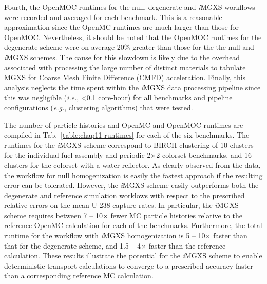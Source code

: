 Fourth, the OpenMOC runtimes for the null, degenerate and \textit{i}\ac{MGXS} workflows were recorded and averaged for each benchmark. This is a reasonable approximation since the OpenMC runtimes are much larger than those for OpenMOC. Nevertheless, it should be noted that the OpenMOC runtimes for the degenerate scheme were on average 20\% greater than those for the the null and \textit{i}\ac{MGXS} schemes. The cause for this slowdown is likely due to the overhead associated with processing the large number of distinct materials to tabulate \ac{MGXS} for Coarse Mesh Finite Difference (\ac{CMFD}) acceleration. Finally, this analysis neglects the time spent within the \textit{i}\ac{MGXS} data processing pipeline since this was negligible (\textit{i.e.}, <0.1 core-hour) for all benchmarks and pipeline configurations (\textit{e.g.}, clustering algorithms) that were tested.

The number of particle histories and OpenMC and OpenMOC runtimes are compiled in Tab.~\ref{table:chap11-runtimes} for each of the six benchmarks. The runtimes for the \textit{i}\ac{MGXS} scheme  correspond to BIRCH clustering of 10 clusters for the individual fuel assembly and periodic 2$\times$2 colorset benchmarks, and 16 clusters for the colorset with a water reflector. As clearly observed from the data, the workflow for null homogenization is easily the fastest approach if the resulting error can be tolerated. However, the \textit{i}\ac{MGXS} scheme easily outperforms both the degenerate and reference simulation worklows with respect to the prescribed relative errors on the mean U-238 capture rates. In particular, the \textit{i}\ac{MGXS} scheme requires between 7 -- 10$\times$ fewer \ac{MC} particle histories relative to the reference OpenMC calculation for each of the benchmarks. Furthermore, the total runtime for the workflow with \textit{i}\ac{MGXS} homogenization is 5 -- 10$\times$ faster than that for the degenerate scheme, and 1.5 -- 4$\times$ faster than the reference calculation. These results illustrate the potential for the \textit{i}\ac{MGXS} scheme to enable deterministic transport calculations to converge to a prescribed accuracy faster than a corresponding reference \ac{MC} calculation.


